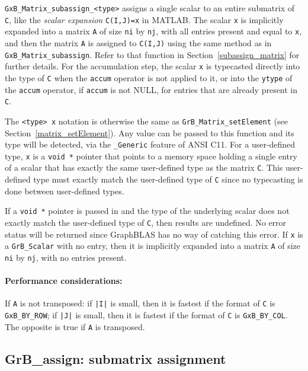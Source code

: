 \documentclass[12pt]{article}
\begin{document}
\verb'GxB_Matrix_subassign_<type>' assigns a single scalar to an entire
submatrix of \verb'C', like the {\em scalar expansion} \verb'C(I,J)=x' in
MATLAB.  The scalar \verb'x' is implicitly expanded into a matrix \verb'A' of
size \verb'ni' by \verb'nj', with all entries present and equal to \verb'x',
and then the matrix \verb'A' is assigned to
\verb'C(I,J)' using the same method as in \verb'GxB_Matrix_subassign'.  Refer
to that function in Section~\ref{subassign_matrix} for further details.
For the accumulation step, the scalar \verb'x' is typecasted directly into the
type of \verb'C' when the \verb'accum' operator is not applied to it, or into
the \verb'ytype' of the \verb'accum' operator, if \verb'accum' is not NULL, for
entries that are already present in \verb'C'.

The \verb'<type> x' notation is otherwise the same as
\verb'GrB_Matrix_setElement' (see Section~\ref{matrix_setElement}).  Any value
can be passed to this function and its type will be detected, via the
\verb'_Generic' feature of ANSI C11.  For a user-defined type, \verb'x' is a
\verb'void *' pointer that points to a memory space holding a single entry of a
scalar that has exactly the same user-defined type as the matrix \verb'C'.
This user-defined type must exactly match the user-defined type of \verb'C'
since no typecasting is done between user-defined types.

If a \verb'void *' pointer is passed in and the type of the underlying scalar
does not exactly match the user-defined type of \verb'C', then results are
undefined.  No error status will be returned since GraphBLAS has no way of
catching this error.
If \verb'x' is a \verb'GrB_Scalar' with no entry, then it is implicitly
expanded into a matrix \verb'A' of size \verb'ni' by \verb'nj', with no entries
present.

\paragraph{\bf Performance considerations:} %
If \verb'A' is not transposed: if \verb'|I|' is small, then it is fastest if
the format of \verb'C' is \verb'GxB_BY_ROW'; if \verb'|J|' is small, then it is
fastest if the format of \verb'C' is \verb'GxB_BY_COL'.  The opposite is true
if \verb'A' is transposed.

\newpage
\subsection{{\sf GrB\_assign:} submatrix assignment} %
\label{assign}
\end{document}

